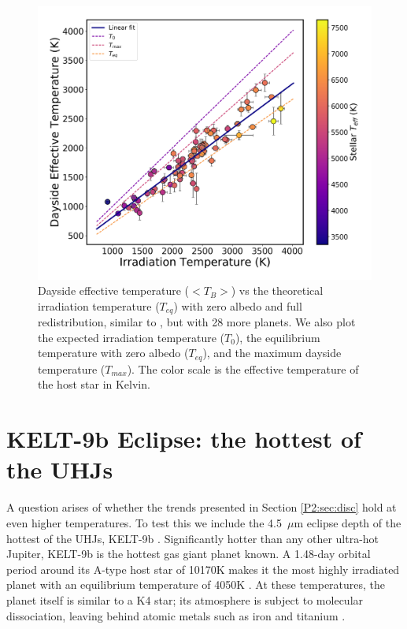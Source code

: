\begin{subappendices}
\begin{figure}
    \centering
    \includegraphics[trim={0.5cm 0cm 0.5cm 0cm},clip,width=\linewidth]{Tb36_PHOENIX_intplvsT0_PHOENIX_intpl.pdf}
    \caption{Dayside effective temperature ($<T_B>$) vs the theoretical irradiation temperature ($T_{eq}$) with zero albedo and full redistribution, similar to \citet{Schwartz2015}, but with 28 more planets. We also plot the expected irradiation temperature ($T_0$), the equilibrium temperature with zero albedo ($T_{eq}$), and the maximum dayside temperature ($T_{max}$). The color scale is the effective temperature of the host star in Kelvin.}
    \label{P2:fig:Td}
\end{figure}

\section{KELT-9b Eclipse: the hottest of the UHJs}
\label{P2:app:kelt9b}

A question arises of  whether  the trends presented  in Section \ref{P2:sec:disc} hold at even higher temperatures. To test this we include the 4.5~$\mu$m eclipse depth of the hottest of the UHJs, KELT-9b \citep{Gaudi2017}. Significantly hotter than any other ultra-hot Jupiter, KELT-9b is the hottest gas giant planet known. A 1.48-day orbital period around its A-type host star of 10170K makes it the most highly irradiated planet with an equilibrium temperature of 4050K \citep{Gaudi2017}. At these temperatures, the planet itself is similar to a K4 star;  its atmosphere is subject to molecular dissociation, leaving behind atomic metals such as iron and titanium \citep{Hoeijmakers2018, Hoeijmakers2019}.


\end{subappendices}
